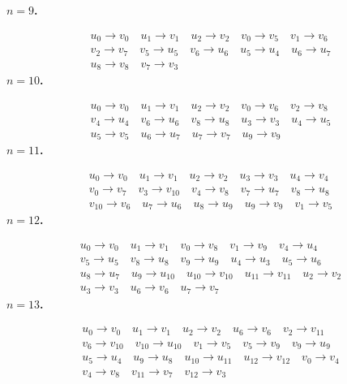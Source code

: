 \documentclass[10pt,a4paper]{article}
\begin{document}
\noindent\textbf{$n=9$.}\par\nopagebreak\[
\begin{gathered}
u_{0}\to v_{0}\quad u_{1}\to v_{1}\quad u_{2}\to v_{2}\quad v_{0}\to v_{5}\quad v_{1}\to v_{6}\\
v_{2}\to v_{7}\quad v_{5}\to u_{5}\quad v_{6}\to u_{6}\quad u_{5}\to u_{4}\quad u_{6}\to u_{7}\\
u_{8}\to v_{8}\quad v_{7}\to v_{3}
\end{gathered}\]
\noindent\textbf{$n=10$.}\par\nopagebreak\[
\begin{gathered}
u_{0}\to v_{0}\quad u_{1}\to v_{1}\quad u_{2}\to v_{2}\quad v_{0}\to v_{6}\quad v_{2}\to v_{8}\\
v_{4}\to u_{4}\quad v_{6}\to u_{6}\quad v_{8}\to u_{8}\quad u_{3}\to v_{3}\quad u_{4}\to u_{5}\\
u_{5}\to v_{5}\quad u_{6}\to u_{7}\quad u_{7}\to v_{7}\quad u_{9}\to v_{9}
\end{gathered}\]
\noindent\textbf{$n=11$.}\par\nopagebreak\[
\begin{gathered}
u_{0}\to v_{0}\quad u_{1}\to v_{1}\quad u_{2}\to v_{2}\quad u_{3}\to v_{3}\quad u_{4}\to v_{4}\\
v_{0}\to v_{7}\quad v_{3}\to v_{10}\quad v_{4}\to v_{8}\quad v_{7}\to u_{7}\quad v_{8}\to u_{8}\\
v_{10}\to v_{6}\quad u_{7}\to u_{6}\quad u_{8}\to u_{9}\quad u_{9}\to v_{9}\quad v_{1}\to v_{5}
\end{gathered}\]
\noindent\textbf{$n=12$.}\par\nopagebreak\[
\begin{gathered}
u_{0}\to v_{0}\quad u_{1}\to v_{1}\quad v_{0}\to v_{8}\quad v_{1}\to v_{9}\quad v_{4}\to u_{4}\\
v_{5}\to u_{5}\quad v_{8}\to u_{8}\quad v_{9}\to u_{9}\quad u_{4}\to u_{3}\quad u_{5}\to u_{6}\\
u_{8}\to u_{7}\quad u_{9}\to u_{10}\quad u_{10}\to v_{10}\quad u_{11}\to v_{11}\quad u_{2}\to v_{2}\\
u_{3}\to v_{3}\quad u_{6}\to v_{6}\quad u_{7}\to v_{7}
\end{gathered}\]
\noindent\textbf{$n=13$.}\par\nopagebreak\[
\begin{gathered}
u_{0}\to v_{0}\quad u_{1}\to v_{1}\quad u_{2}\to v_{2}\quad u_{6}\to v_{6}\quad v_{2}\to v_{11}\\
v_{6}\to v_{10}\quad v_{10}\to u_{10}\quad v_{1}\to v_{5}\quad v_{5}\to v_{9}\quad v_{9}\to u_{9}\\
u_{5}\to u_{4}\quad u_{9}\to u_{8}\quad u_{10}\to u_{11}\quad u_{12}\to v_{12}\quad v_{0}\to v_{4}\\
v_{4}\to v_{8}\quad v_{11}\to v_{7}\quad v_{12}\to v_{3}
\end{gathered}\]
\end{document}
